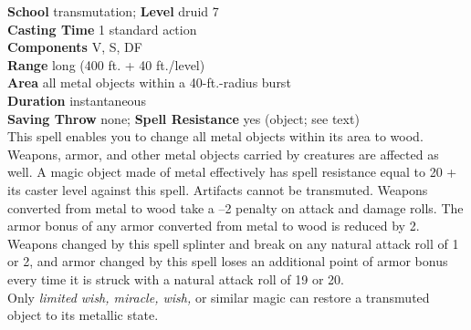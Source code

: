 \textbf{School} transmutation; \textbf{Level} druid 7\\
\textbf{Casting Time} 1 standard action\\
\textbf{Components} V, S, DF\\
\textbf{Range} long (400 ft. + 40 ft./level)\\
\textbf{Area} all metal objects within a 40-ft.-radius burst\\
\textbf{Duration} instantaneous\\
\textbf{Saving Throw} none; \textbf{Spell Resistance} yes (object; see text)\\
This spell enables you to change all metal objects within its area to wood. Weapons, armor, and other metal objects carried by creatures are affected as well. A magic object made of metal effectively has spell resistance equal to 20 + its caster level against this spell. Artifacts cannot be transmuted. Weapons converted from metal to wood take a --2 penalty on attack and damage rolls. The armor bonus of any armor converted from metal to wood is reduced by 2. Weapons changed by this spell splinter and break on any natural attack roll of 1 or 2, and armor changed by this spell loses an additional point of armor bonus every time it is struck with a natural attack roll of 19 or 20.\\
Only \textit{limited wish, miracle, wish, }or similar magic can restore a transmuted object to its metallic state.\\
